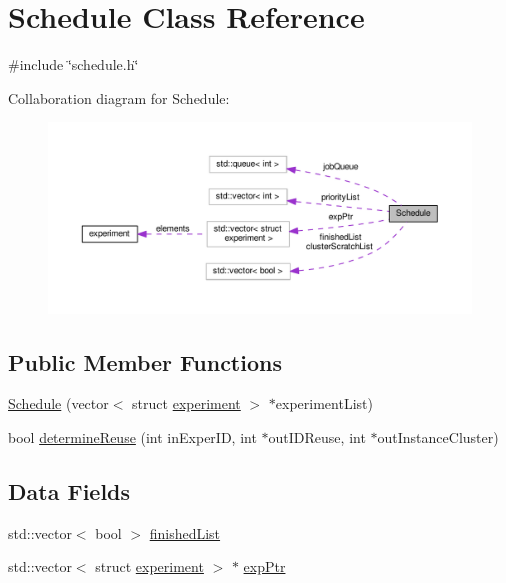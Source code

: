 \hypertarget{classSchedule}{\section{Schedule Class Reference}
\label{classSchedule}
}


{\ttfamily \#include \char`\"{}schedule.\-h\char`\"{}}



Collaboration diagram for Schedule\-:\nopagebreak
\begin{figure}[H]
\begin{center}
\leavevmode
\includegraphics[width=350pt]{classSchedule__coll__graph}
\end{center}
\end{figure}
\subsection*{Public Member Functions}
\begin{DoxyCompactItemize}
\item 
\hyperlink{classSchedule_a5e92f7e6f259168a8634d60d33cd65ed}{Schedule} (vector$<$ struct \hyperlink{structexperiment}{experiment} $>$ $\ast$experiment\-List)
\item 
bool \hyperlink{classSchedule_a2f1dfef54409f093d3900169af84b850}{determine\-Reuse} (int in\-Exper\-I\-D, int $\ast$out\-I\-D\-Reuse, int $\ast$out\-Instance\-Cluster)
\end{DoxyCompactItemize}
\subsection*{Data Fields}
\begin{DoxyCompactItemize}
\item 
std\-::vector$<$ bool $>$ \hyperlink{classSchedule_a0e3d2c52318e5c7060c9fa9ea4e9956b}{finished\-List}
\item 
std\-::vector$<$ struct \hyperlink{structexperiment}{experiment} $>$ $\ast$ \hyperlink{classSchedule_a6be64e3a9e572d346e11481b49d55b7f}{exp\-Ptr}
\end{DoxyCompactItemize}
